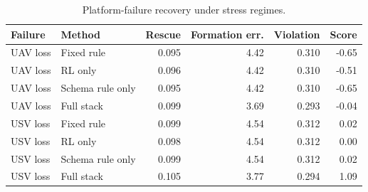 \begin{table}[t]
  \centering
  \caption{Platform-failure recovery under stress regimes.}
  \label{tab:platform_failure}
  \begin{tabular}{llrrrr}
    \toprule
    Failure & Method & Rescue & Formation err. & Violation & Score \\
    \midrule
    UAV loss & Fixed rule & 0.095 & 4.42 & 0.310 & -0.65 \\
    UAV loss & RL only & 0.096 & 4.42 & 0.310 & -0.51 \\
    UAV loss & Schema rule only & 0.095 & 4.42 & 0.310 & -0.65 \\
    UAV loss & Full stack & 0.099 & 3.69 & 0.293 & -0.04 \\
    \midrule
    USV loss & Fixed rule & 0.099 & 4.54 & 0.312 & 0.02 \\
    USV loss & RL only & 0.098 & 4.54 & 0.312 & 0.00 \\
    USV loss & Schema rule only & 0.099 & 4.54 & 0.312 & 0.02 \\
    USV loss & Full stack & 0.105 & 3.77 & 0.294 & 1.09 \\
    \bottomrule
  \end{tabular}
\end{table}
